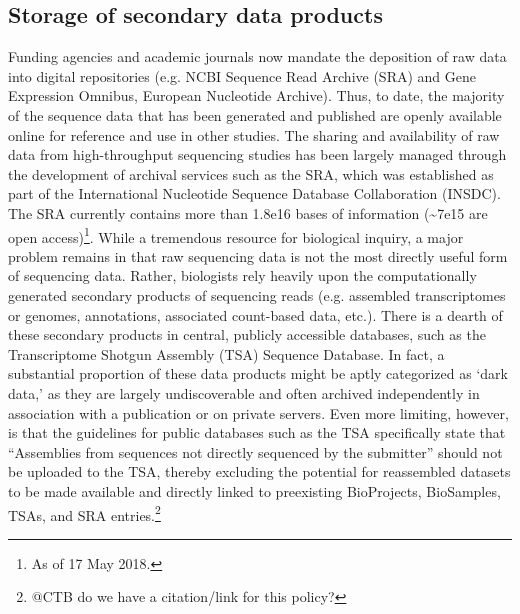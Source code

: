 \documentclass[12pt]{article}
\begin{document}
\subsection{Storage of secondary data products}
Funding agencies and academic journals now mandate the deposition of raw data into digital repositories (e.g. NCBI Sequence Read Archive (SRA) and Gene Expression Omnibus, European Nucleotide Archive). Thus, to date, the majority of the sequence data that has been generated and published are openly available online for reference and use in other studies. The sharing and availability of raw data from high-throughput sequencing studies has been largely managed through the development of archival services such as the SRA, which was established as part of the International Nucleotide Sequence Database Collaboration (INSDC)\cite{Kodama2012, Shumway2009}. The SRA currently contains more than 1.8e16 bases of information (\textasciitilde7e15 are open access)\footnote{As of 17 May 2018.}. While a tremendous resource for biological inquiry, a major problem remains in that raw sequencing data is not the most directly useful form of sequencing data. Rather, biologists rely heavily upon the computationally generated secondary products of sequencing reads (e.g. assembled transcriptomes or genomes, annotations, associated count-based data, etc.). There is a dearth of these secondary products in central, publicly accessible databases, such as the  Transcriptome Shotgun Assembly (TSA) Sequence Database.
In fact, a substantial proportion of these data products might be aptly categorized as `dark data,' as they are largely undiscoverable and often archived independently in association with a publication or on private servers. Even more limiting, however, is that the guidelines for public databases such as the TSA specifically state that ``Assemblies from sequences not directly sequenced by the submitter'' should not be uploaded to the TSA, thereby excluding the potential for reassembled datasets to be made available and directly linked to preexisting BioProjects, BioSamples, TSAs, and SRA entries.\footnote{@CTB do we have a citation/link for this policy?}
\end{document}

